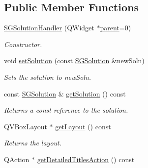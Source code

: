 \subsection*{Public Member Functions}
\begin{DoxyCompactItemize}
\item 
\hyperlink{classSGSolutionHandler_ae1158f6e80ba8cc08c6d3e23f2bd1fbd}{S\+G\+Solution\+Handler} (Q\+Widget $\ast$\hyperlink{classSGSolutionHandler_acad6ff1e5871e5956d56ef11160c5659}{parent}=0)
\begin{DoxyCompactList}\small\item\em Constructor. \end{DoxyCompactList}\item 
\mbox{\label{classSGSolutionHandler_ad5aa37af7bae522a094e4b4eb855345c}} 
void \hyperlink{classSGSolutionHandler_ad5aa37af7bae522a094e4b4eb855345c}{set\+Solution} (const \hyperlink{classSGSolution}{S\+G\+Solution} \&new\+Soln)
\begin{DoxyCompactList}\small\item\em Sets the solution to new\+Soln. \end{DoxyCompactList}\item 
\mbox{\label{classSGSolutionHandler_a2152b235fb8ab5ecdf0216ac3f519d2b}} 
const \hyperlink{classSGSolution}{S\+G\+Solution} \& \hyperlink{classSGSolutionHandler_a2152b235fb8ab5ecdf0216ac3f519d2b}{get\+Solution} () const
\begin{DoxyCompactList}\small\item\em Returns a const reference to the solution. \end{DoxyCompactList}\item 
\mbox{\label{classSGSolutionHandler_a3bed74aae3faea743be69ec5486b63ca}} 
Q\+V\+Box\+Layout $\ast$ \hyperlink{classSGSolutionHandler_a3bed74aae3faea743be69ec5486b63ca}{get\+Layout} () const
\begin{DoxyCompactList}\small\item\em Returns the layout. \end{DoxyCompactList}\item 
\mbox{\label{classSGSolutionHandler_a2304a413d545b5a2653fdba5d414ef40}} 
Q\+Action $\ast$ \hyperlink{classSGSolutionHandler_a2304a413d545b5a2653fdba5d414ef40}{get\+Detailed\+Titles\+Action} () const

\end{DoxyCompactItemize}

